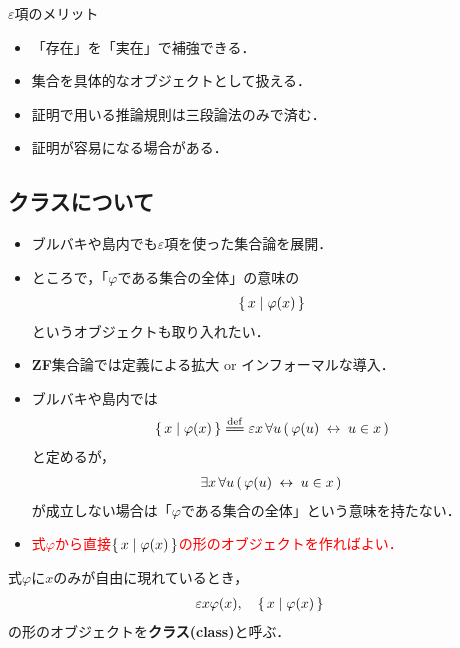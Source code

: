 	\begin{itembox}[l]{$\varepsilon$項のメリット}
		\begin{itemize}
			\item 「存在」を「実在」で補強できる．
			\item 集合を具体的なオブジェクトとして扱える．
			\item 証明で用いる推論規則は三段論法のみで済む．
			\item 証明が容易になる場合がある．
		\end{itemize}
	\end{itembox}
	
\newpage
\subsection{クラスについて}
	\begin{itemize}
	\setlength{\itemsep}{10pt}
		\item ブルバキ\cite{}や島内\cite{}でも$\varepsilon$項を使った集合論を展開．
		
		\item ところで，「$\varphi$である集合の全体」の意味の
			\begin{align}
				\left\{\, x \mid \varphi(x)\, \right\}
			\end{align}
			というオブジェクトも取り入れたい．
		
		\item {\bf ZF}集合論では定義による拡大 or インフォーマルな導入．
		
		\item ブルバキ\cite{}や島内\cite{}では
			\begin{align}
				\Set{x}{\varphi(x)} \defeq \varepsilon x\, \forall u\, 
				(\, \varphi(u) \lrarrow u \in x\, )
			\end{align}
			と定めるが，
			\begin{align}
				\exists x\, \forall u\, (\, \varphi(u) \hspace{0.25em}\leftrightarrow\hspace{0.25em} u \in x\, )
			\end{align}
			が成立しない場合は「$\varphi$である集合の全体」という意味を持たない．
			
		\item \textcolor{red}{式$\varphi$から直接$\left\{\, x \mid \varphi(x)\, \right\}$の形のオブジェクトを作ればよい．}
	\end{itemize}
	
\newpage
	\begin{screen}
		\begin{dfn}[クラス]
			式$\varphi$に$x$のみが自由に現れているとき，
			\begin{align}
				\varepsilon x \varphi(x), \quad \left\{\, x \mid \varphi(x)\, \right\}
			\end{align}
			の形のオブジェクトを{\bf クラス(class)}と呼ぶ．
		\end{dfn}
	\end{screen}
	
